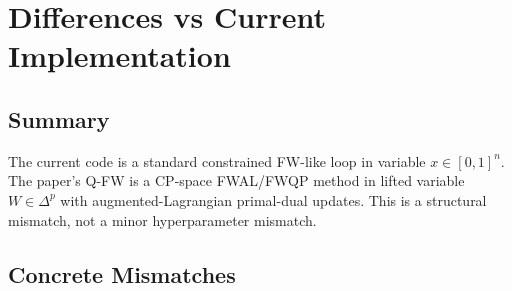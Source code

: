 \documentclass[11pt]{article}
\begin{document}
\section{Differences vs Current Implementation}
\subsection{Summary}
The current code is a standard constrained FW-like loop in variable $x\in[0,1]^n$.
The paper's Q-FW is a CP-space FWAL/FWQP method in lifted variable $W\in\Delta^p$
with augmented-Lagrangian primal-dual updates.
This is a structural mismatch, not a minor hyperparameter mismatch.

\subsection{Concrete Mismatches}
\end{document}
